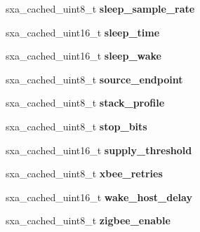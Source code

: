\begin{DoxyCompactItemize}
\item 
\hypertarget{structsxa__node__t_a9438233a08e6ad639e8d2ef265afa76c}{sxa\-\_\-cached\-\_\-uint8\-\_\-t {\bfseries sleep\-\_\-sample\-\_\-rate}}\label{structsxa__node__t_a9438233a08e6ad639e8d2ef265afa76c}

\item 
\hypertarget{structsxa__node__t_a1b8b3953786fc8f4e85babd2424714ea}{sxa\-\_\-cached\-\_\-uint16\-\_\-t {\bfseries sleep\-\_\-time}}\label{structsxa__node__t_a1b8b3953786fc8f4e85babd2424714ea}

\item 
\hypertarget{structsxa__node__t_a5c074f146b34af1d0676c4ed20dd8add}{sxa\-\_\-cached\-\_\-uint16\-\_\-t {\bfseries sleep\-\_\-wake}}\label{structsxa__node__t_a5c074f146b34af1d0676c4ed20dd8add}

\item 
\hypertarget{structsxa__node__t_a797bdd82fbff3c15a514b681fb86497d}{sxa\-\_\-cached\-\_\-uint8\-\_\-t {\bfseries source\-\_\-endpoint}}\label{structsxa__node__t_a797bdd82fbff3c15a514b681fb86497d}

\item 
\hypertarget{structsxa__node__t_ad870c94f6e1cb4697b6d2e04f15e71e7}{sxa\-\_\-cached\-\_\-uint8\-\_\-t {\bfseries stack\-\_\-profile}}\label{structsxa__node__t_ad870c94f6e1cb4697b6d2e04f15e71e7}

\item 
\hypertarget{structsxa__node__t_aee1069d5bd2d37c3be8c5c5d4e17fa02}{sxa\-\_\-cached\-\_\-uint8\-\_\-t {\bfseries stop\-\_\-bits}}\label{structsxa__node__t_aee1069d5bd2d37c3be8c5c5d4e17fa02}

\item 
\hypertarget{structsxa__node__t_a3212070d20eab81e78e6ed45c625d9cf}{sxa\-\_\-cached\-\_\-uint16\-\_\-t {\bfseries supply\-\_\-threshold}}\label{structsxa__node__t_a3212070d20eab81e78e6ed45c625d9cf}

\item 
\hypertarget{structsxa__node__t_aaf807aaf291b79ce0e474e3bc5525e3a}{sxa\-\_\-cached\-\_\-uint8\-\_\-t {\bfseries xbee\-\_\-retries}}\label{structsxa__node__t_aaf807aaf291b79ce0e474e3bc5525e3a}

\item 
\hypertarget{structsxa__node__t_ae6f50e937e739f9f76268cd9ada5913b}{sxa\-\_\-cached\-\_\-uint16\-\_\-t {\bfseries wake\-\_\-host\-\_\-delay}}\label{structsxa__node__t_ae6f50e937e739f9f76268cd9ada5913b}

\item 
\hypertarget{structsxa__node__t_a7305c35cc7e30bf2e8f957bc632bd568}{sxa\-\_\-cached\-\_\-uint8\-\_\-t {\bfseries zigbee\-\_\-enable}}\label{structsxa__node__t_a7305c35cc7e30bf2e8f957bc632bd568}


\end{DoxyCompactItemize}
